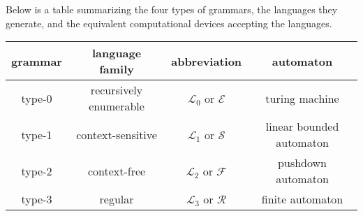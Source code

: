 \documentclass[12pt]{article}
\begin{document}
Below is a table summarizing the four types of grammars, the languages they generate, and the equivalent computational devices accepting the languages.
\begin{center}
\begin{tabular}{|c|c|c|c|}
\hline\hline
grammar & language family & abbreviation & automaton \\
\hline\hline
type-0 & recursively enumerable & $\mathscr{L}_0$ or $\mathscr{E}$ & turing machine \\
\hline
type-1 & context-sensitive & $\mathscr{L}_1$ or $\mathscr{S}$ & linear bounded automaton \\
\hline
type-2 & context-free & $\mathscr{L}_2$ or $\mathscr{F}$ & pushdown automaton \\
\hline
type-3 & regular & $\mathscr{L}_3$ or $\mathscr{R}$ & finite automaton \\
\hline
\end{tabular}
\end{center}
\end{document}
